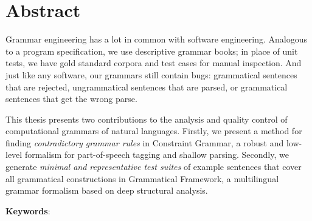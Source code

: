 \chapter*{Abstract}\label{chp:abstract}




 

Grammar engineering has a lot in common with software engineering. 
Analogous to a program specification, we use descriptive grammar
books; in place of unit tests, we have gold standard corpora and test
cases for manual inspection. And just like any software, our grammars
still contain bugs: grammatical sentences that are rejected,
ungrammatical sentences that are parsed, or grammatical sentences that
get the wrong parse.

This thesis presents two contributions to the analysis and quality
control of computational grammars of natural languages. Firstly, we
present a method for finding \emph{contradictory grammar rules} in
Constraint Grammar, a robust and low-level formalism for
part-of-speech tagging and shallow parsing.  Secondly, we generate
\emph{minimal and representative test suites} of example sentences
that cover all grammatical constructions in Grammatical Framework, a
multilingual grammar formalism based on deep structural analysis.





\bigskip
\noindent
\textbf{Keywords}: \emph{\phdkeywords}
